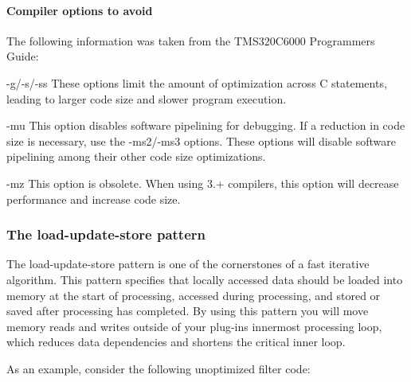 \hypertarget{a00832_subsubsection__compiler_options_to_avoid_}{}\paragraph{Compiler options to avoid}\label{a00832_subsubsection__compiler_options_to_avoid_}
 The following information was taken from the T\+M\+S320\+C6000 Programmer\textquotesingle{}s Guide\+:


\begin{DoxyItemize}
\item {\ttfamily -\/g/-\/s/-\/ss}  These options limit the amount of optimization across C statements, leading to larger code size and slower program execution.  


\item {\ttfamily -\/mu}  This option disables software pipelining for debugging. If a reduction in code size is necessary, use the {\ttfamily -\/ms2}/{\ttfamily -\/ms3} options. These options will disable software pipelining among their other code size optimizations.  


\item {\ttfamily -\/mz}  This option is obsolete. When using 3.+ compilers, this option will decrease performance and increase code size.  


\end{DoxyItemize}

\hypertarget{a00832_subsection__the_loadupdatestore_pattern}{}\subsubsection{The load-\/update-\/store pattern}\label{a00832_subsection__the_loadupdatestore_pattern}
 The load-\/update-\/store pattern is one of the cornerstones of a fast iterative algorithm. This pattern specifies that locally accessed data should be loaded into memory at the start of processing, accessed during processing, and stored or saved after processing has completed. By using this pattern you will move memory reads and writes outside of your plug-\/in\textquotesingle{}s innermost processing loop, which reduces data dependencies and shortens the critical inner loop.

As an example, consider the following unoptimized filter code\+:


